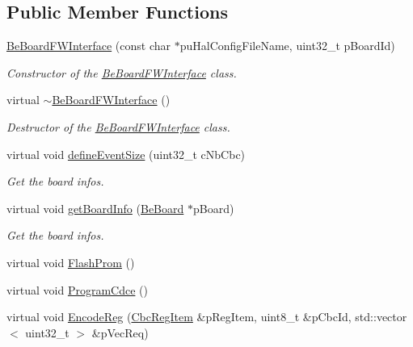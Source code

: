 \subsection*{Public Member Functions}
\begin{DoxyCompactItemize}
\item 
\hyperlink{class_ph2___hw_interface_1_1_be_board_f_w_interface_a6a6be2907a3f6494422abb3ae2b35bd1}{Be\-Board\-F\-W\-Interface} (const char $\ast$pu\-Hal\-Config\-File\-Name, uint32\-\_\-t p\-Board\-Id)
\begin{DoxyCompactList}\small\item\em Constructor of the \hyperlink{class_ph2___hw_interface_1_1_be_board_f_w_interface}{Be\-Board\-F\-W\-Interface} class. \end{DoxyCompactList}\item 
virtual \hyperlink{class_ph2___hw_interface_1_1_be_board_f_w_interface_a22077ee1db6eb5ae149165bff88b5fa0}{$\sim$\-Be\-Board\-F\-W\-Interface} ()
\begin{DoxyCompactList}\small\item\em Destructor of the \hyperlink{class_ph2___hw_interface_1_1_be_board_f_w_interface}{Be\-Board\-F\-W\-Interface} class. \end{DoxyCompactList}\item 
virtual void \hyperlink{class_ph2___hw_interface_1_1_be_board_f_w_interface_a3532be4560a6c84d8c69fcc3b86e7678}{define\-Event\-Size} (uint32\-\_\-t c\-Nb\-Cbc)
\begin{DoxyCompactList}\small\item\em Get the board infos. \end{DoxyCompactList}\item 
virtual void \hyperlink{class_ph2___hw_interface_1_1_be_board_f_w_interface_a565131fd918a485d8af1d9ae162c5230}{get\-Board\-Info} (\hyperlink{class_ph2___hw_description_1_1_be_board}{Be\-Board} $\ast$p\-Board)
\begin{DoxyCompactList}\small\item\em Get the board infos. \end{DoxyCompactList}\item 
virtual void \hyperlink{class_ph2___hw_interface_1_1_be_board_f_w_interface_ad19ee1309003c559db472046af4620d5}{Flash\-Prom} ()
\item 
virtual void \hyperlink{class_ph2___hw_interface_1_1_be_board_f_w_interface_a9575de192b6dd5613857ce255ec6947b}{Program\-Cdce} ()
\item 
virtual void \hyperlink{class_ph2___hw_interface_1_1_be_board_f_w_interface_a11f16d760d3e3df44daec200ac8d4275}{Encode\-Reg} (\hyperlink{struct_ph2___hw_description_1_1_cbc_reg_item}{Cbc\-Reg\-Item} \&p\-Reg\-Item, uint8\-\_\-t \&p\-Cbc\-Id, std\-::vector$<$ uint32\-\_\-t $>$ \&p\-Vec\-Req)

\end{DoxyCompactItemize}
